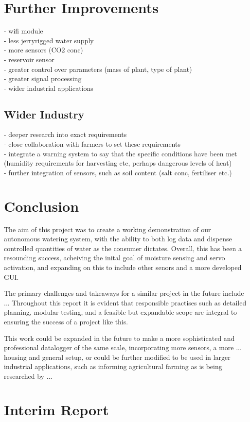 \documentclass[a4paper,11pt]{article}
\begin{document}
\section{Further Improvements}
\label{sec:Further_Improvements}
- wifi module \\
- less jerryrigged water supply\\
- more sensors (CO2 conc)\\
- reservoir sensor\\
- greater control over parameters (mass of plant, type of plant)\\
- greater signal processing\\
- wider industrial applications

\subsection{Wider Industry}
\label{sec:Wider_Industry}
- deeper research into exact requirements\\
- close collaboration with farmers to set these requirements\\
- integrate a warning system to say that the specific conditions have been met (humidity requirements for harvesting etc, perhaps dangerous levels of heat)\\
- further integration of sensors, such as soil content (salt conc, fertiliser etc.)

\section{Conclusion}
\label{sec:Conclusion}

The aim of this project was to create a working demonstration of 
our autonomous watering system, with the ability to both log data
and dispense controlled quantities of water 
as the consumer dictates.
Overall, this has been a resounding success, 
acheiving the inital goal of moisture sensing and servo activation,
and expanding on this to include other senors 
and a more developed GUI.

The primary challenges and takeaways for a similar project in the future
include ...
Throughout this report it is evident that responsible practises 
such as detailed planning, modular testing,
and a feasible but expandable scope are integral to 
ensuring the success of a project like this.

This work could be expanded in the future to make a 
more sophisticated and professional datalogger
of the same scale,
incorporating more sensors, a more ... housing and 
general setup,
or could be further modified to be used in larger
industrial applications, such as informing agricultural farming
as is being researched by ...

\newpage
\appendix
\begin{thebibliography}{9}

\end{thebibliography}
\section{Interim Report}
\end{document}
